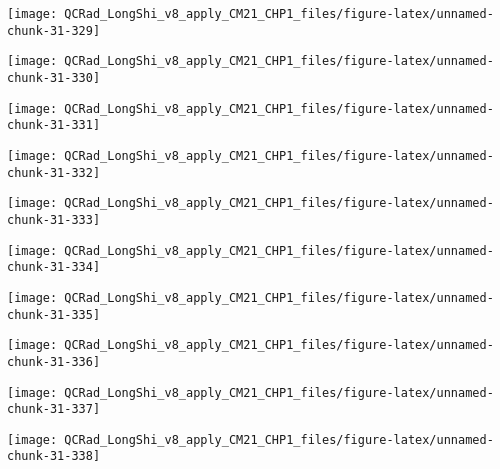 \documentclass[
  10pt,
  a4paper,oneside]{article}
\begin{document}
\begin{center}\texttt{[image: QCRad\_LongShi\_v8\_apply\_CM21\_CHP1\_files/figure-latex/unnamed-chunk-31-329]} \end{center}

\begin{center}\texttt{[image: QCRad\_LongShi\_v8\_apply\_CM21\_CHP1\_files/figure-latex/unnamed-chunk-31-330]} \end{center}

\begin{center}\texttt{[image: QCRad\_LongShi\_v8\_apply\_CM21\_CHP1\_files/figure-latex/unnamed-chunk-31-331]} \end{center}

\begin{center}\texttt{[image: QCRad\_LongShi\_v8\_apply\_CM21\_CHP1\_files/figure-latex/unnamed-chunk-31-332]} \end{center}

\begin{center}\texttt{[image: QCRad\_LongShi\_v8\_apply\_CM21\_CHP1\_files/figure-latex/unnamed-chunk-31-333]} \end{center}

\begin{center}\texttt{[image: QCRad\_LongShi\_v8\_apply\_CM21\_CHP1\_files/figure-latex/unnamed-chunk-31-334]} \end{center}

\begin{center}\texttt{[image: QCRad\_LongShi\_v8\_apply\_CM21\_CHP1\_files/figure-latex/unnamed-chunk-31-335]} \end{center}

\begin{center}\texttt{[image: QCRad\_LongShi\_v8\_apply\_CM21\_CHP1\_files/figure-latex/unnamed-chunk-31-336]} \end{center}

\begin{center}\texttt{[image: QCRad\_LongShi\_v8\_apply\_CM21\_CHP1\_files/figure-latex/unnamed-chunk-31-337]} \end{center}

\begin{center}\texttt{[image: QCRad\_LongShi\_v8\_apply\_CM21\_CHP1\_files/figure-latex/unnamed-chunk-31-338]} \end{center}
\end{document}
